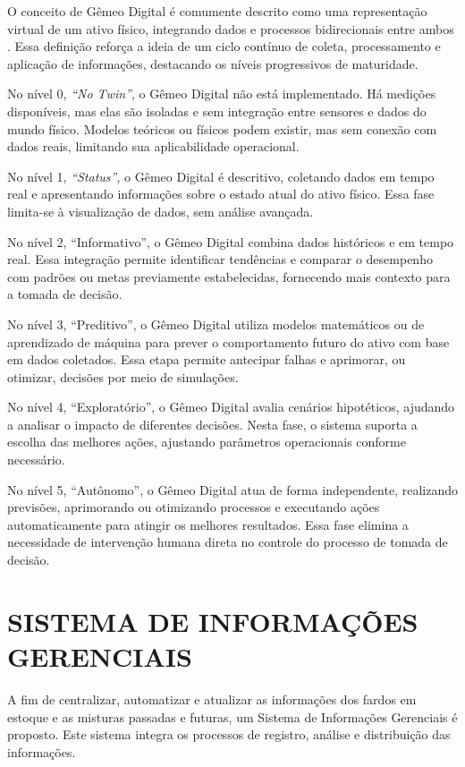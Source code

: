 \documentclass[
    12pt,                %
    openright,           %
    oneside,             %
    a4paper,             %
    english,             %
    spanish,             %
    brazil               %
]{ufscar}
\begin{document}
O conceito de Gêmeo Digital é comumente descrito como uma representação virtual de um ativo físico, integrando dados e processos bidirecionais entre ambos \cite{JONES202036}. Essa definição reforça a ideia de um ciclo contínuo de coleta, processamento e aplicação de informações, destacando os níveis progressivos de maturidade.

No nível 0, \textit{``No Twin''}, o Gêmeo Digital não está implementado. Há medições disponíveis, mas elas são isoladas e sem integração entre sensores e dados do mundo físico. Modelos teóricos ou físicos podem existir, mas sem conexão com dados reais, limitando sua aplicabilidade operacional.

No nível 1, \textit{``Status''}, o Gêmeo Digital é descritivo, coletando dados em tempo real e apresentando informações sobre o estado atual do ativo físico. Essa fase limita-se à visualização de dados, sem análise avançada.

No nível 2, ``Informativo'', o Gêmeo Digital combina dados históricos e em tempo real. Essa integração permite identificar tendências e comparar o desempenho com padrões ou metas previamente estabelecidas, fornecendo mais contexto para a tomada de decisão.

No nível 3, ``Preditivo'', o Gêmeo Digital utiliza modelos matemáticos ou de aprendizado de máquina para prever o comportamento futuro do ativo com base em dados coletados. Essa etapa permite antecipar falhas e aprimorar, ou otimizar, decisões por meio de simulações.

No nível 4, ``Exploratório'', o Gêmeo Digital avalia cenários hipotéticos, ajudando a analisar o impacto de diferentes decisões. Nesta fase, o sistema suporta a escolha das melhores ações, ajustando parâmetros operacionais conforme necessário.

No nível 5, ``Autônomo'', o Gêmeo Digital atua de forma independente, realizando previsões, aprimorando ou otimizando processos e executando ações automaticamente para atingir os melhores resultados. Essa fase elimina a necessidade de intervenção humana direta no controle do processo de tomada de decisão.

\section{SISTEMA DE INFORMAÇÕES GERENCIAIS}

A fim de centralizar, automatizar e atualizar as informações dos fardos em estoque e as misturas passadas e futuras, um Sistema de Informações Gerenciais é proposto. Este sistema integra os processos de registro, análise e distribuição das informações.
\end{document}
